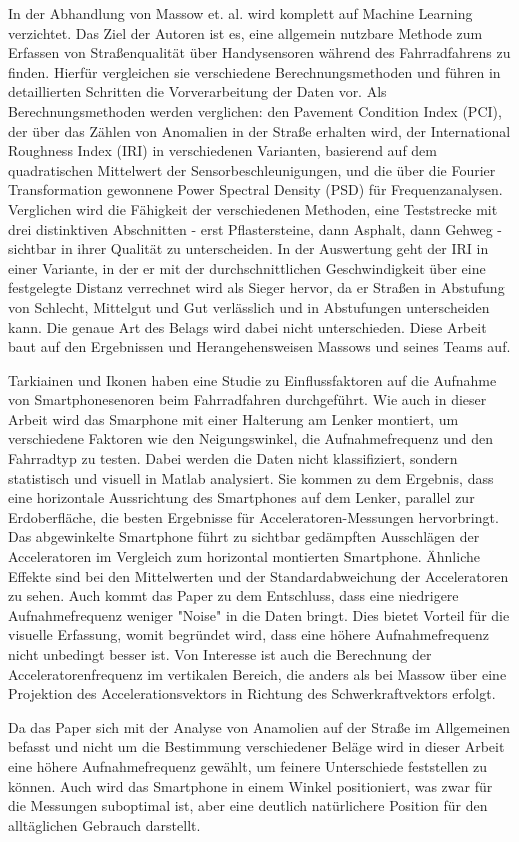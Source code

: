 In der Abhandlung von Massow et. al. wird komplett auf Machine Learning verzichtet. Das Ziel der Autoren ist es, eine allgemein nutzbare Methode zum Erfassen von Straßenqualität über Handysensoren während des Fahrradfahrens zu finden. Hierfür vergleichen sie verschiedene Berechnungsmethoden und führen in detaillierten Schritten die Vorverarbeitung der Daten vor. Als Berechnungsmethoden werden verglichen: den Pavement Condition Index (PCI), der über das Zählen von Anomalien in der Straße erhalten wird, der International Roughness Index (IRI) in verschiedenen Varianten, basierend auf dem quadratischen Mittelwert der Sensorbeschleunigungen, und die über die Fourier Transformation gewonnene Power Spectral Density (PSD) für Frequenzanalysen. Verglichen wird die Fähigkeit der verschiedenen Methoden, eine Teststrecke mit drei distinktiven Abschnitten - erst Pflastersteine, dann Asphalt, dann Gehweg - sichtbar in ihrer Qualität zu unterscheiden. In der Auswertung geht der IRI in einer Variante, in der er mit der durchschnittlichen Geschwindigkeit über eine festgelegte Distanz verrechnet wird als Sieger hervor, da er Straßen in Abstufung von Schlecht, Mittelgut und Gut verlässlich und in Abstufungen unterscheiden kann. Die genaue Art des Belags wird dabei nicht unterschieden. \cite{Massow2024} Diese Arbeit baut auf den Ergebnissen und Herangehensweisen Massows und seines Teams auf.

Tarkiainen und Ikonen haben eine Studie zu Einflussfaktoren auf die Aufnahme von Smartphonesenoren beim Fahrradfahren durchgeführt. Wie auch in dieser Arbeit wird das Smarphone mit einer Halterung am Lenker montiert, um verschiedene Faktoren wie den Neigungswinkel, die Aufnahmefrequenz und den Fahrradtyp zu testen. Dabei werden die Daten nicht klassifiziert, sondern statistisch und visuell in Matlab analysiert. Sie kommen zu dem Ergebnis, dass eine horizontale Aussrichtung des Smartphones auf dem Lenker, parallel zur Erdoberfläche, die besten Ergebnisse für Acceleratoren-Messungen hervorbringt. Das abgewinkelte Smartphone führt zu sichtbar gedämpften Ausschlägen der Acceleratoren im Vergleich zum horizontal montierten Smartphone. Ähnliche Effekte sind bei den Mittelwerten und der Standardabweichung der Acceleratoren zu sehen. Auch kommt das Paper zu dem Entschluss, dass eine niedrigere Aufnahmefrequenz weniger "Noise" in die Daten bringt. Dies bietet Vorteil für die visuelle Erfassung, womit begründet wird, dass eine höhere Aufnahmefrequenz nicht unbedingt besser ist. Von Interesse ist auch die Berechnung der Acceleratorenfrequenz im vertikalen Bereich, die anders als bei Massow über eine Projektion des Accelerationsvektors in Richtung des Schwerkraftvektors erfolgt. \cite{Tarkiainen2025}

Da das Paper sich mit der Analyse von Anamolien auf der Straße im Allgemeinen befasst und nicht um die Bestimmung verschiedener Beläge wird in dieser Arbeit eine höhere Aufnahmefrequenz gewählt, um feinere Unterschiede feststellen zu können. Auch wird das Smartphone in einem Winkel positioniert, was zwar für die Messungen suboptimal ist, aber eine deutlich natürlichere Position für den alltäglichen Gebrauch darstellt.